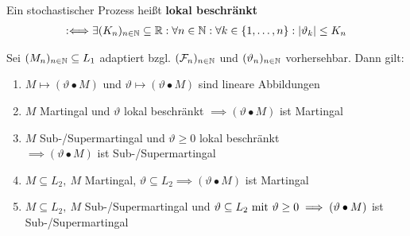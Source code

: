 \begin{defi} %
Ein stochastischer Prozess heißt \textbf{lokal beschränkt}
\begin{align*}
:\Longleftrightarrow\exists(K_n)_{n\in\N}\subseteq\R:\forall n\in\N:\forall k\in\lbrace1,\ldots,n\rbrace:|\vartheta_k|\leq K_n
\end{align*}
\end{defi}

\begin{theorem}\label{theorem2.5}
Sei $(M_n)_{n\in\N}\subseteq L_1$ adaptiert bzgl. $(\F_n)_{n\in\N}$ und $(\vartheta_n)_{n\in\N}$ vorhersehbar. Dann gilt:

\begin{enumerate}[label=(\alph*)]
\item $M\mapsto(\vartheta\bullet M)$ und $\vartheta\mapsto(\vartheta\bullet M)$ sind lineare Abbildungen
\item $M$ Martingal und $\vartheta$ lokal beschränkt $\implies(\vartheta\bullet M)$ ist Martingal
\item $M$ Sub-/Supermartingal und $\vartheta\geq0$ lokal beschränkt\\ $\implies(\vartheta\bullet M)$ ist Sub-/Supermartingal
\item $M\subseteq L_2,~M$ Martingal, $\vartheta\subseteq L_2\implies(\vartheta\bullet M)$ ist Martingal
\item $M\subseteq L_2,~M$ Sub-/Supermartingal und $\vartheta\subseteq L_2\mit\vartheta\geq0\\\implies(\vartheta\bullet M)$ ist Sub-/Supermartingal
\end{enumerate}
\end{theorem}

